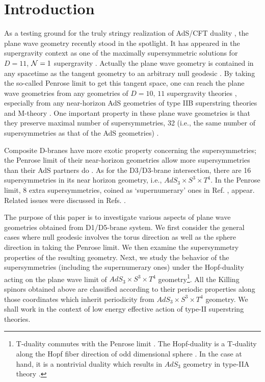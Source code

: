 \documentclass[a4paper,12pt]{article}
\begin{document}
\section{Introduction}

As a testing ground for the truly stringy realization of AdS/CFT duality \cite{maldacena}, the plane wave geometry recently stood in the spotlight. It has appeared in the supergravity context as one of the maximally supersymmetric solutions for $D=11$, ${\cal N}=1$ supergravity \cite{kowalski}. Actually the plane wave geometry is contained in any spacetime as the tangent geometry to an arbitrary null geodesic \cite{penrose}. By taking the so-called Penrose limit to get this tangent space, one can reach the plane wave geometries from any geometries of $D=10,\,11$ supergravity theories \cite{gueven1,gueven2}, especially from any near-horizon AdS geometries of type IIB superstring theories and M-theory \cite{blau2,blau3}. One important property in these plane wave geometries is that they preserve maximal number of supersymmetries, 32 (i.e., the same number of supersymmetries as that of the AdS geometries) \cite{blau1,figueroa}. 

Composite D-branes have more exotic property concerning the supersymmetries; the Penrose limit of their near-horizon geometries allow more supersymmetries than their AdS partners do \cite{cvetic,gauntlett}. As for the D3/D3-brane intersection, there are 16 supersymmetries in its near horizon geometry, i.e., $AdS_3\times S^3\times T^4$. In the Penrose limit, 8 extra supersymmetries, coined as `supernumerary' ones in Ref. \cite{cvetic}, appear. Related issues were discussed in Refs. \cite{lu2,singh,kumar}.

The purpose of this paper is to investigate various aspects of plane wave geometries obtained from D1/D5-brane system. We first consider the general cases where null geodesic involves the torus direction as well as the sphere direction in taking the Penrose limit. We then examine the supersymmetry properties of the resulting geometry. Next, we study the behavior of the supersymmetries (including the supernumerary ones) under the Hopf-duality acting on the plane wave limit of $AdS_3\times S^3\times T^4$ geometry\footnote{T-duality commutes with the Penrose limit \cite{gueven2}. The Hopf-duality is a T-duality along the Hopf fiber direction of odd dimensional sphere \cite{duff2}. In the case at hand, it is a nontrivial duality which results in $AdS_3$ geometry in type-IIA theory \cite{duff}.}.  All the Killing spinors obtained above are classified according to their periodic properties along those coordinates which inherit periodicity from $AdS_3\times S^3\times T^4$ geometry. We shall work in the context of low energy effective action of type-II superstring theories.
\end{document}
